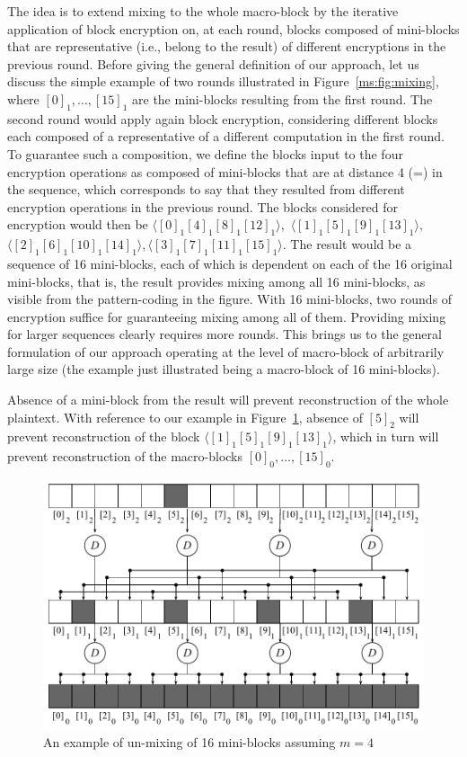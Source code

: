 The idea is to extend mixing to the whole macro-block by the iterative application of block encryption on, at each round, blocks composed of mini-blocks that are representative (i.e., belong to the result) of different encryptions in the previous round. Before giving the general definition of our approach, let us discuss the simple example of two rounds illustrated in Figure~\ref{ms:fig:mixing}, where $[0]_1, \ldots, [15]_1$ are the mini-blocks resulting from the first round. The second round would apply again block encryption, considering different blocks each composed of a representative of a different computation in the first round. To guarantee such a composition, we define the blocks input to the four encryption operations as composed of mini-blocks that are at distance 4 (=\mnumb) in the sequence, which corresponds to say that they resulted from different encryption operations in the previous round. The blocks considered for encryption would then be $\langle [0]_1[4]_1[8]_1[12]_1\rangle,$ $\langle [1]_1[5]_1[9]_1[13]_1\rangle,$$ \langle [2]_1[6]_1[10]_1[14]_1\rangle, $$\langle [3]_1[7]_1[11]_1[15]_1 \rangle.$ The result would be a sequence of 16 mini-blocks, each of which is dependent on each of the 16 original mini-blocks, that is, the result provides mixing among all 16 mini-blocks, as visible from the pattern-coding in the figure. With 16 mini-blocks, two rounds of encryption suffice for guaranteeing mixing among all of them. Providing mixing for larger sequences clearly requires more rounds. This brings us to the general formulation of our approach operating at the level of macro-block of arbitrarily large size (the example just illustrated being a macro-block of 16 mini-blocks).

Absence of a mini-block from the result will prevent reconstruction of the whole plaintext. With reference to our example in Figure~\ref{ms:fig:unmixing}, absence of $[5]_2$ will prevent reconstruction of the block $\langle [1]_1[5]_1[9]_1[13]_1\rangle$, which in turn will prevent reconstruction of the macro-blocks $[0]_0, \ldots, [15]_0$.

\begin{figure}[!t]
	\centering
	\includegraphics[width=0.9\columnwidth]{figures/decrypt}
	\caption{\label{ms:fig:unmixing} An example of un-mixing of 16 mini-blocks assuming $m=4$}
\end{figure}

